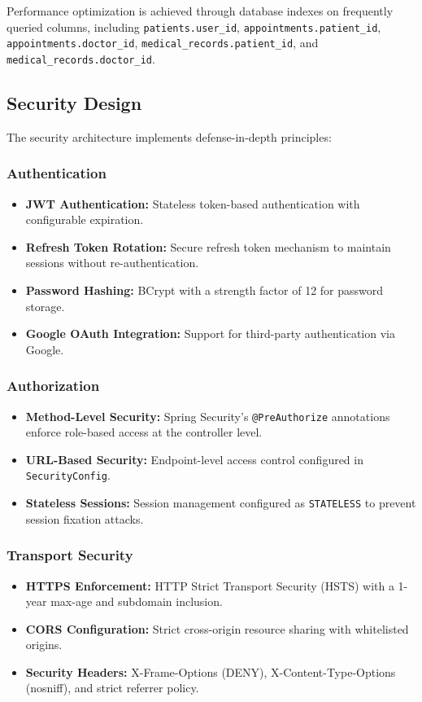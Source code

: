 \documentclass[conference]{IEEEtran}
\begin{document}
Performance optimization is achieved through database indexes on frequently queried columns, including \texttt{patients.user\_id}, \texttt{appointments.patient\_id}, \texttt{appointments.doctor\_id}, \texttt{medical\_records.patient\_id}, and \texttt{medical\_records.doctor\_id}.

\subsection{Security Design}

The security architecture implements defense-in-depth principles:

\subsubsection{Authentication}
\begin{itemize}[leftmargin=*]
  \item \textbf{JWT Authentication:} Stateless token-based authentication with configurable expiration.
  \item \textbf{Refresh Token Rotation:} Secure refresh token mechanism to maintain sessions without re-authentication.
  \item \textbf{Password Hashing:} BCrypt with a strength factor of 12 for password storage.
  \item \textbf{Google OAuth Integration:} Support for third-party authentication via Google.
\end{itemize}

\subsubsection{Authorization}
\begin{itemize}[leftmargin=*]
  \item \textbf{Method-Level Security:} Spring Security's \texttt{@PreAuthorize} annotations enforce role-based access at the controller level.
  \item \textbf{URL-Based Security:} Endpoint-level access control configured in \texttt{SecurityConfig}.
  \item \textbf{Stateless Sessions:} Session management configured as \texttt{STATELESS} to prevent session fixation attacks.
\end{itemize}

\subsubsection{Transport Security}
\begin{itemize}[leftmargin=*]
  \item \textbf{HTTPS Enforcement:} HTTP Strict Transport Security (HSTS) with a 1-year max-age and subdomain inclusion.
  \item \textbf{CORS Configuration:} Strict cross-origin resource sharing with whitelisted origins.
  \item \textbf{Security Headers:} X-Frame-Options (DENY), X-Content-Type-Options (nosniff), and strict referrer policy.
\end{itemize}
\end{document}
